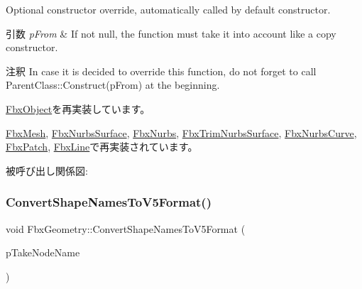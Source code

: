 Optional constructor override, automatically called by default constructor. 
\begin{DoxyParams}{引数}
{\em p\+From} & If not null, the function must take it into account like a copy constructor. \\
\hline
\end{DoxyParams}
\begin{DoxyRemark}{注釈}
In case it is decided to override this function, do not forget to call Parent\+Class\+::\+Construct(p\+From) at the beginning. 
\end{DoxyRemark}


\hyperlink{class_fbx_object_a313503bc645af3fdceb4a99ef5cea7eb}{Fbx\+Object}を再実装しています。



\hyperlink{class_fbx_mesh_a230787ca87312437d427d9ec7c150565}{Fbx\+Mesh}, \hyperlink{class_fbx_nurbs_surface_a3487d194007af1729d31dc9dfa0b12c9}{Fbx\+Nurbs\+Surface}, \hyperlink{class_fbx_nurbs_a1d62f29d7315e343d5c0c414dab3fabb}{Fbx\+Nurbs}, \hyperlink{class_fbx_trim_nurbs_surface_a95ea54578a57e9038ae67cb2b6b26f82}{Fbx\+Trim\+Nurbs\+Surface}, \hyperlink{class_fbx_nurbs_curve_ac730e9ec1d56724f8495725b0491ddd8}{Fbx\+Nurbs\+Curve}, \hyperlink{class_fbx_patch_a82fbbc0a7ec019bbe69c976ab755b23e}{Fbx\+Patch}, \hyperlink{class_fbx_line_a42d7e3fb4684712df04464644abee11a}{Fbx\+Line}で再実装されています。

被呼び出し関係図\+:
\mbox{\label{class_fbx_geometry_a2b135cea388e72bff364a6fa8714a38b}} 
\subsubsection{\texorpdfstring{Convert\+Shape\+Names\+To\+V5\+Format()}{ConvertShapeNamesToV5Format()}\hspace{0.1cm}{\footnotesize\ttfamily [1/2]}}
{\footnotesize\ttfamily void Fbx\+Geometry\+::\+Convert\+Shape\+Names\+To\+V5\+Format (\begin{DoxyParamCaption}\item[{\hyperlink{class_fbx_string}{Fbx\+String}}]{p\+Take\+Node\+Name }\end{DoxyParamCaption})}

\mbox{\label{class_fbx_geometry_aa1806aadaf07dac7d895e65f731f1679}} 
